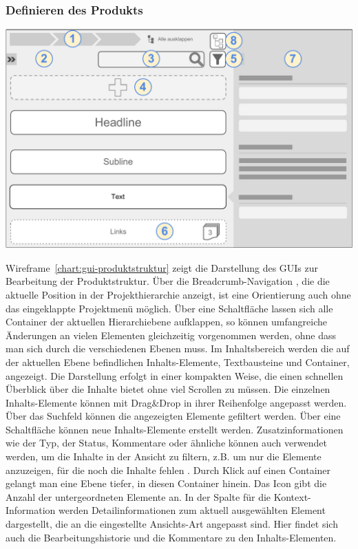 \pagebreak

\subsubsection{Definieren des Produkts}\label{l:gui-definition}

\begin{center}
\includegraphics[width=\textwidth]{media/GUIProduktstruktur.pdf}
\label{chart:gui-produktstruktur}
\end{center}

Wireframe~\ref{chart:gui-produktstruktur} zeigt die Darstellung des GUIs zur Bearbeitung der Produktstruktur. Über die Breadcrumb-Navigation , die die aktuelle Position in der Projekthierarchie anzeigt, ist eine Orientierung auch ohne das eingeklappte Projektmenü möglich. Über eine Schaltfläche lassen sich alle Container der aktuellen Hierarchiebene aufklappen, so können umfangreiche Änderungen an vielen Elementen gleichzeitig vorgenommen werden, ohne dass man sich durch die verschiedenen Ebenen  muss. Im Inhaltsbereich  werden die auf der aktuellen Ebene befindlichen Inhalts-Elemente, Textbausteine und Container, angezeigt. Die Darstellung erfolgt in einer kompakten Weise, die einen schnellen Überblick über die Inhalte bietet ohne viel Scrollen zu müssen. Die einzelnen Inhalts-Elemente können mit Drag\&Drop in ihrer Reihenfolge angepasst werden. Über das Suchfeld  können die angezeigten Elemente gefiltert werden. Über eine Schaltfläche  können neue Inhalts-Elemente erstellt werden. Zusatzinformationen wie der Typ, der Status, Kommentare oder ähnliche können auch verwendet werden, um die Inhalte in der Ansicht zu filtern, z.B. um nur die Elemente anzuzeigen, für die noch die Inhalte fehlen . Durch Klick auf einen Container  gelangt man eine Ebene tiefer, in diesen Container hinein. Das Icon gibt die Anzahl der untergeordneten Elemente an. In der Spalte für die Kontext-Information  werden Detailinformationen zum aktuell ausgewählten Element dargestellt, die an die eingestellte Ansichts-Art angepasst sind. Hier findet sich auch die Bearbeitungshistorie und die Kommentare zu den Inhalts-Elementen.

